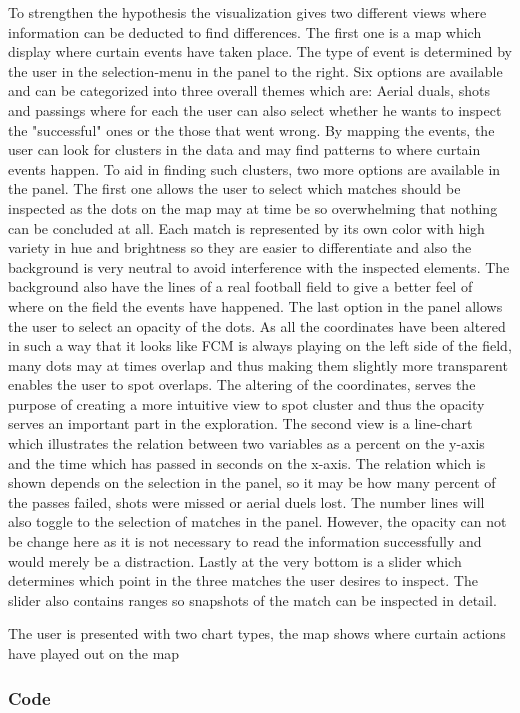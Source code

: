\documentclass[11pt]{article}
\begin{document}
To strengthen the hypothesis the visualization gives two different views where information can be deducted to find differences. The first one is a map which display where curtain events have taken place. The type of event is determined by the user in the selection-menu in the panel to the right. Six options are available and can be categorized into three overall themes which are: Aerial duals, shots and passings where for each the user can also select whether he wants to inspect the "successful" ones or the those that went wrong. By mapping the events, the user can look for clusters in the data and may find patterns to where curtain events happen. To aid in finding such clusters, two more options are available in the panel. The first one allows the user to select which matches should be inspected as the dots on the map may at time be so overwhelming that nothing can be concluded at all. Each match is represented by its own color with high variety in hue and brightness so they are easier to differentiate and also the background is very neutral to avoid interference with the inspected elements. The background also have the lines of a real football field to give a better feel of where on the field the events have happened. The last option in the panel allows the user to select an opacity of the dots. As all the coordinates have been altered in such a way that it looks like FCM is always playing on the left side of the field, many dots may at times overlap and thus making them slightly more transparent enables the user to spot overlaps. The altering of the coordinates, serves the purpose of creating a more intuitive view to spot cluster and thus the opacity serves an important part in the exploration. The second view is a line-chart which illustrates the relation between two variables as a percent on the y-axis and the time which has passed in seconds on the x-axis. The relation which is shown depends on the selection in the panel, so it may be how many percent of the passes failed, shots were missed or aerial duels lost. The number lines will also toggle to the selection of matches in the panel. However, the opacity can not be change here as it is not necessary to read the information successfully and would merely be a distraction. Lastly at the very bottom is a slider which determines which point in the three matches the user desires to inspect. The slider also contains ranges so snapshots of the match can be inspected in detail.















The user is presented with two chart types, the map shows where curtain actions have played out on the map 
\subsubsection*{Code}

	
\end{document}
